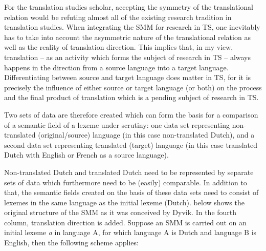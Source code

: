 For the translation studies scholar, accepting the symmetry of the translational relation would be refuting almost all of the existing research tradition in translation studies. When integrating the SMM for research in TS, one inevitably has to take into account the asymmetric nature of the translational relation as well as the reality of translation direction. This implies that, in my view, translation – as an activity which forms the subject of research in TS – always happens in the direction from a source language into a target language. Differentiating between source and target language does matter in TS, for it is precisely the influence of either source or target language (or both) on the process and the final product of translation which is a pending subject of research in TS.

Two sets of data are therefore created which can form the basis for a comparison of a semantic field of a lexeme under scrutiny: one data set representing non-translated (original/source) language (in this case non-translated Dutch), and a second data set representing translated (target) language (in this case translated Dutch with English or French as a source language).

Non-translated Dutch and translated Dutch need to be represented by separate sets of data which furthermore need to be (easily) comparable. In addition to that, the semantic fields created on the basis of these data sets need to consist of lexemes in the same language as the initial lexeme (Dutch).  below shows the original structure of the SMM as it was conceived by Dyvik. In the fourth column, translation direction is added. Suppose an SMM is carried out on an initial lexeme \textit{a} in language A, for which language A is Dutch and language B is English, then the following scheme applies:

\begin{table}
\caption{\label{tab:3:1} Source and target language in the different steps of the SMM}

\end{table}
  
